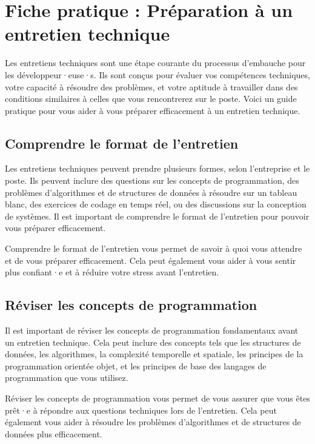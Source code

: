 \chapter{Fiche pratique : Préparation à un entretien technique}

Les entretiens techniques sont une étape courante du processus d'embauche pour les développeur·euse·s. Ils sont conçus pour évaluer vos compétences techniques, votre capacité à résoudre des problèmes, et votre aptitude à travailler dans des conditions similaires à celles que vous rencontrerez sur le poste. Voici un guide pratique pour vous aider à vous préparer efficacement à un entretien technique.

\section{Comprendre le format de l'entretien}

Les entretiens techniques peuvent prendre plusieurs formes, selon l'entreprise et le poste. Ils peuvent inclure des questions sur les concepts de programmation, des problèmes d'algorithmes et de structures de données à résoudre sur un tableau blanc, des exercices de codage en temps réel, ou des discussions sur la conception de systèmes. Il est important de comprendre le format de l'entretien pour pouvoir vous préparer efficacement.

Comprendre le format de l'entretien vous permet de savoir à quoi vous attendre et de vous préparer efficacement. Cela peut également vous aider à vous sentir plus confiant·e et à réduire votre stress avant l'entretien.

\section{Réviser les concepts de programmation}

Il est important de réviser les concepts de programmation fondamentaux avant un entretien technique. Cela peut inclure des concepts tels que les structures de données, les algorithmes, la complexité temporelle et spatiale, les principes de la programmation orientée objet, et les principes de base des langages de programmation que vous utilisez.

Réviser les concepts de programmation vous permet de vous assurer que vous êtes prêt·e à répondre aux questions techniques lors de l'entretien. Cela peut également vous aider à résoudre les problèmes d'algorithmes et de structures de données plus efficacement.

